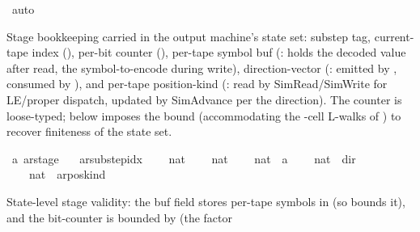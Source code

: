 \begin{isabellebody}
\ auto\isanewline
{}\isamarkupfalse%
%
\endisatagproof
{\isafoldproof}%
%
\isadelimproof
%
\endisadelimproof
%
\begin{isamarkuptext}%
Stage bookkeeping carried in the output machine's state
  set: substep tag, current-tape index (), per-bit
  counter (), per-tape symbol buf
  (: holds the decoded value after read, the
  symbol-to-encode during write), direction-vector
  (: emitted by ,
  consumed by ), and per-tape position-kind
  (: read by SimRead/SimWrite for
  LE/proper dispatch, updated by SimAdvance per the direction).
  The  counter is loose-typed; 
  below imposes the bound 
  (accommodating the -cell L-walks of
  ) to recover finiteness of the state
  set.%
\end{isamarkuptext}\isamarkuptrue%
\isamarkupfalse%
\ {\isacharprime}{\kern0pt}a\ ar{\isacharunderscore}{\kern0pt}stage\ {\isacharequal}{\kern0pt}\isanewline
\ \ {\isachardoublequoteopen}ar{\isacharunderscore}{\kern0pt}substep{\isacharunderscore}{\kern0pt}idx\isanewline
\ \ \ {\isasymtimes}\ nat\isanewline
\ \ \ {\isasymtimes}\ nat\isanewline
\ \ \ {\isasymtimes}\ {\isacharparenleft}{\kern0pt}nat\ {\isasymRightarrow}\ {\isacharprime}{\kern0pt}a{\isacharparenright}{\kern0pt}\isanewline
\ \ \ {\isasymtimes}\ {\isacharparenleft}{\kern0pt}nat\ {\isasymRightarrow}\ dir{\isacharparenright}{\kern0pt}\isanewline
\ \ \ {\isasymtimes}\ {\isacharparenleft}{\kern0pt}nat\ {\isasymRightarrow}\ ar{\isacharunderscore}{\kern0pt}pos{\isacharunderscore}{\kern0pt}kind{\isacharparenright}{\kern0pt}{\isachardoublequoteclose}%
\begin{isamarkuptext}%
State-level stage validity: the  buf
  field stores per-tape symbols in
   (so  bounds it),
  and the  bit-counter is bounded by
   (the factor 

\end{isamarkuptext}
\end{isabellebody}
